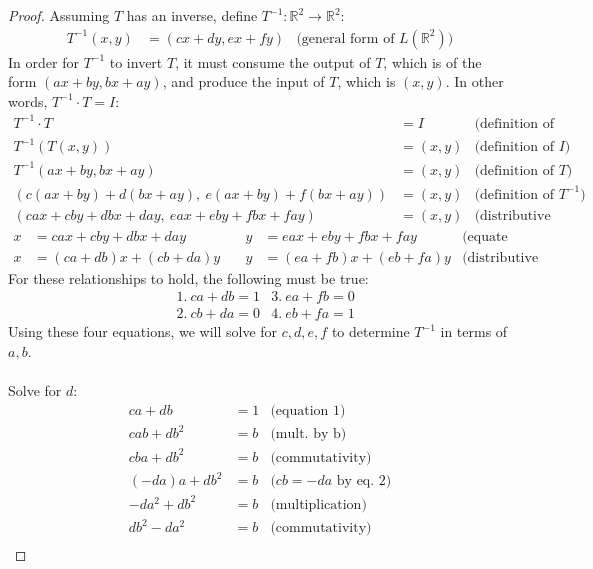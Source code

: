 \documentclass[12pt,reqno]{article}
\theoremstyle{definition}
\begin{document}
\begin{proof}
    Assuming $T$ has an inverse, define $T^{-1}:\mathbb{R}^2 \rightarrow \mathbb{R}^2$:
    \begin{align*}
            T^{-1}(x, y) &= (cx + dy, ex + fy) &\text{(general form of $L(\mathbb{R}^2)$)}
    \end{align*}
    In order for $T^{-1}$ to invert $T$, it must consume the output of $T$, which is of the form $(ax + by, bx + ay)$, and produce the input of $T$, which is $(x, y)$. In other words, $T^{-1}\cdot T = I$:
    \begin{align*}
        T^{-1}\cdot T &= I & \text{(definition of inverse)}\\
        T^{-1}(T(x, y)) &= (x, y) & \text{(definition of $I$)}\\
        T^{-1}(ax + by, bx + ay) &= (x, y) & \text{(definition of $T$)}\\
        (c(ax+by)+d(bx+ay),\ e(ax+by)+f(bx+ay)) &= (x, y) & \text{(definition of $T^{-1}$)}\\
        (cax+cby+dbx+day,\ eax+eby+fbx+fay) &= (x, y) & \text{(distributive property)}
    \end{align*}
    \begin{align*}
        x &= cax+cby+dbx+day\quad & y &= eax+eby+fbx+fay & \text{(equate components)}\\
        x &= (ca+db)x+(cb+da)y\quad & y &= (ea+fb)x+(eb+fa)y & \text{(distributive prop.)}
    \end{align*}
    For these relationships to hold, the following must be true:
    \begin{align*}
        &\text{1.}\ ca+db=1
        &\text{3.}\ ea+fb=0\\
        &\text{2.}\ cb+da=0
        &\text{4.}\ eb+fa=1
    \end{align*}
    Using these four equations, we will solve for $c,d,e,f$ to determine $T^{-1}$ in terms of $a,b$. \\\\
    Solve for $d$:
    \begin{align*}
        ca+db&=1 & \text{(equation 1)}\\
        cab+db^2&=b &\text{(mult. by b)}\\
        cba+db^2&=b &\text{(commutativity)}\\
        (-da)a+db^2&=b &\text{($cb=-da$ by eq. 2)}\\
        -da^2+db^2&=b &\text{(multiplication)}\\
        db^2-da^2&=b &\text{(commutativity)}\\

\end{align*}
\end{proof}
\end{document}
